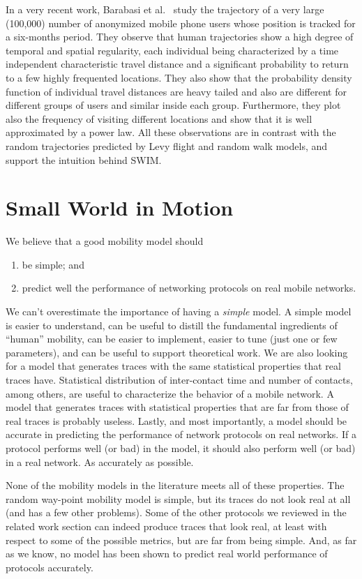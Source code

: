\documentclass[conference]{IEEEtran}
\begin{document}
In a very recent work, Barabasi et al.~\cite{barabasi08} study the trajectory of
a very large (100,000) number of anonymized mobile phone users whose position is
tracked for a six-months period. They observe that human trajectories show a
high degree of temporal and spatial regularity, each individual being
characterized by a time independent characteristic travel distance and a
significant probability to return to a few highly frequented locations. They
also show that the probability density function of individual travel distances
are heavy tailed and also are different for different groups of users and
similar inside each group. Furthermore, they plot also the frequency of visiting
different locations and show that it is well approximated by a power law. All
these observations are in contrast with the random trajectories predicted by
Levy flight and random walk models, and support the intuition behind SWIM.

\section{Small World in Motion}
\label{sec:solution}

We believe that a good mobility model should
\begin{enumerate}
	\item be simple; and
	\item predict well the performance of networking protocols on real mobile
	networks.
\end{enumerate}
We can't overestimate the importance of having a \emph{simple} model. A simple
model is easier to understand, can be useful to distill the fundamental
ingredients of ``human'' mobility, can be easier to implement, easier to tune
(just one or few parameters), and can be useful to support theoretical work. We
are also looking for a model that generates traces with the same statistical
properties that real traces have. Statistical distribution of inter-contact time
and number of contacts, among others, are useful to characterize the behavior of
a mobile network. A model that generates traces with statistical properties that
are far from those of real traces is probably useless. Lastly, and most
importantly, a model should be accurate in predicting the performance of network
protocols on real networks. If a protocol performs well (or bad) in the model,
it should also perform well (or bad) in a real network. As accurately as
possible.

None of the mobility models in the literature meets all of these properties. The random way-point mobility model is simple, but its traces do not look real at all (and has a few other problems). Some of the other protocols we reviewed in the related work section can indeed produce traces that look real, at least with respect to some of the possible metrics, but are far from being simple. And, as far as we know, no model has been shown to predict real world performance of protocols accurately.
\end{document}
